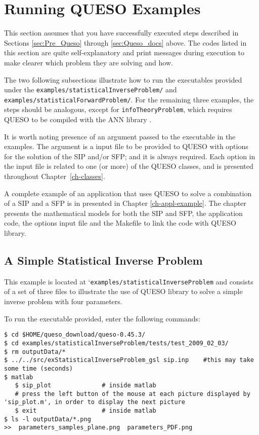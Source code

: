 \section{Running QUESO Examples} \label{sc-running-execs}

This section assumes that you have successfully executed steps described in Sections \ref{sec:Pre_Queso} through \ref{sec:Queso_docs} above.
The codes listed in this section are quite self-explanatory and print messages during execution to make clearer which problem they are solving and how. 


The two following subsections illustrate how to run the executables provided under the \verb+examples/statisticalInverseProblem/+ and \verb+examples/statisticalForwardProblem/+. For the remaining three examples, the steps should be analogous, except for \verb+infoTheoryProblem+, which requires QUESO to be compiled with the ANN library \cite{ANN}.


It is worth noting presence of an argument passed to the executable in the examples. The argument is a input file to be provided to QUESO with options for the solution of the SIP and/or SFP; and it is always required. Each option in the input file is related to one (or more) of the QUESO classes, and is presented throughout Chapter~\ref{ch-classes}. 

A complete example of an application that uses QUESO to solve a combination of a SIP and a SFP is in presented in Chapter \ref{ch-appl-example}. The chapter presents the mathematical models for both the SIP and SFP, the application code, the options input file and the Makefile to link the code  with QUESO library.


\subsection{A Simple Statistical Inverse Problem}\label{sec:executable_sip}

This example is located at `\verb+examples/statisticalInverseProblem+ and consists of a set  of three files to illustrate the use of QUESO library to solve a simple inverse problem with four parameters.

To run the executable provided, enter the following commands:
\begin{lstlisting}[label={},caption={}]
$ cd $HOME/queso_download/queso-0.45.3/
$ cd examples/statisticalInverseProblem/tests/test_2009_02_03/
$ rm outputData/*
$ ../../src/exStatisticalInverseProblem_gsl sip.inp    #this may take some time (seconds)
$ matlab
   $ sip_plot	           # inside matlab
   # press the left button of the mouse at each picture displayed by 'sip_plot.m', in order to display the next picture
   $ exit	               # inside matlab
$ ls -l outputData/*.png
>>  parameters_samples_plane.png  parameters_PDF.png
\end{lstlisting}

